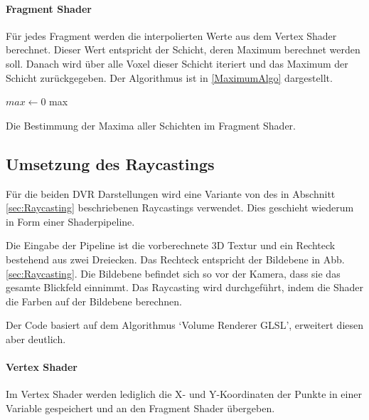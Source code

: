 \documentclass[a4paper,fontsize=12pt,toc=bib,halfparskip]{scrartcl}
\begin{document}
\paragraph{Fragment Shader}
F\"ur jedes Fragment werden die interpolierten Werte aus dem Vertex Shader berechnet. Dieser Wert entspricht der Schicht, deren Maximum berechnet werden soll. Danach wird \"uber alle Voxel dieser Schicht iteriert und das Maximum der Schicht zur\"uckgegeben. Der Algorithmus ist in \ref{MaximumAlgo} dargestellt.

\begin{algorithm}
	
	$max \gets 0$\;
	\Return max\;
	\vspace{0.5cm}
	\caption{Die Bestimmung der Maxima aller Schichten im Fragment Shader.}
	\label{MaximumAlgo}
\end{algorithm}

\subsection{Umsetzung des Raycastings}
\label{RaycastingImplementation}

F\"ur die beiden DVR Darstellungen wird eine Variante von des in Abschnitt \ref{sec:Raycasting} beschriebenen Raycastings verwendet. Dies geschieht wiederum in Form einer Shaderpipeline.

Die Eingabe der Pipeline ist die vorberechnete 3D Textur und ein Rechteck bestehend aus zwei Dreiecken. Das Rechteck entspricht der Bildebene in Abb. \ref{sec:Raycasting}. Die Bildebene befindet sich so vor der Kamera, dass sie das gesamte Blickfeld einnimmt. Das Raycasting wird durchgef\"uhrt, indem die Shader die Farben auf der Bildebene berechnen.

Der Code basiert auf dem Algorithmus `Volume Renderer GLSL', erweitert diesen aber deutlich.

\paragraph{Vertex Shader}
Im Vertex Shader werden lediglich die X- und Y-Koordinaten der Punkte in einer Variable gespeichert und an den Fragment Shader \"ubergeben.
\end{document}
